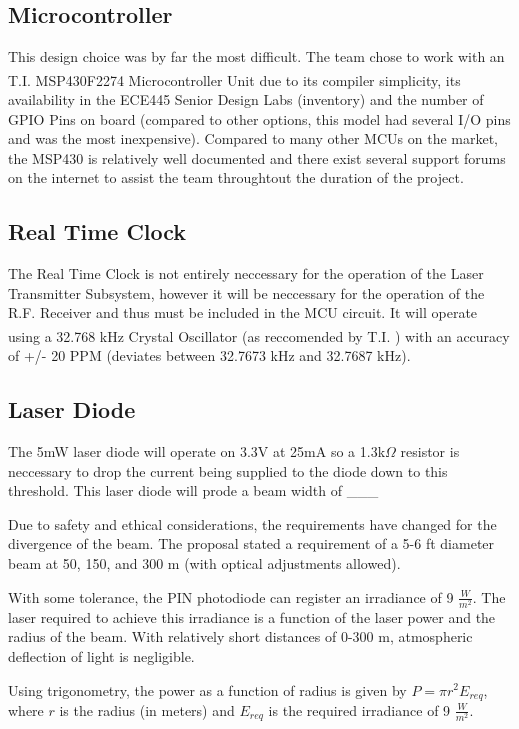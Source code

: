 \documentclass[letterpaper,10pt]{article}
\begin{document}
\begin{spacing}{1.15}
\subsection*{Microcontroller}
This design choice was by far the most difficult. The team chose to work with an T.I. MSP430F2274 Microcontroller Unit \textsuperscript{\cite{MSP430F2274}} due to its compiler simplicity, its availability in the ECE445 Senior Design Labs (inventory) and the number of GPIO Pins on board (compared to other options, this model had several I/O pins and was the most inexpensive). Compared to many other MCUs on the market, the MSP430 is relatively well documented and there exist several support forums on the internet to assist the team throughtout the duration of the project.

\subsection*{Real Time Clock}
The Real Time Clock is not entirely neccessary for the operation of the Laser Transmitter Subsystem, however it will be neccessary for the operation of the R.F. Receiver and thus must be included in the MCU circuit. It will operate using a 32.768 kHz Crystal Oscillator (as reccomended by T.I. \textsuperscript{\cite{RTC-Implementation}}) with an accuracy of +/- 20 PPM (deviates between 32.7673 kHz and 32.7687 kHz).

\subsection*{Laser Diode}
The 5mW laser diode will operate on 3.3V at 25mA so a 1.3k$\Omega$ resistor is neccessary to drop the current being supplied to the diode down to this threshold. This laser diode will prode a beam width of \_\_\_

Due to safety and ethical considerations, the requirements have changed for the divergence of the beam. The proposal stated a requirement of a 5-6 ft diameter beam at 50, 150, and 300 m (with optical adjustments allowed). 

With some tolerance, the PIN photodiode can register an irradiance of 9 $\frac{W}{m^2}$. The laser required to achieve this irradiance is a function of the laser power and the radius of the beam. With relatively short distances of 0-300 m, atmospheric deflection of light is negligible. 

Using trigonometry, the power as a function of radius is given by $P = \pi r^2  E_{req} $, where $r$ is the radius (in meters) and $E_{req}$ is the required irradiance of 9 $\frac{W}{m^2}$. 


\end{spacing}
\end{document}
